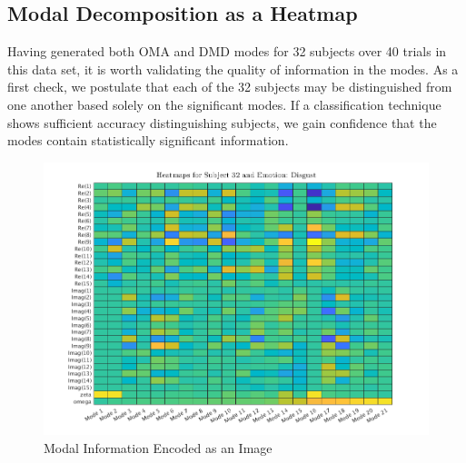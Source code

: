 \subsection{Modal Decomposition as a Heatmap}
Having generated both OMA and DMD modes for 32 subjects over 40 trials in this data set, it is worth validating the quality of information in the modes. As a first check, we postulate that each of the 32 subjects may be distinguished from one another based solely on the significant modes. If a classification technique shows sufficient accuracy distinguishing subjects, we gain confidence that the modes contain statistically significant information.

\begin{figure}
\centering
\includegraphics[scale=0.45]{../../../figures/demo_map.png} 
\caption{Modal Information Encoded as an Image}
\label{fig:heatmaps}
\end{figure}
